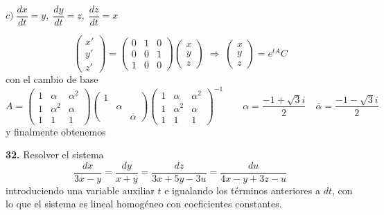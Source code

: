 \begin{ejer}
\begin{sol}
    \end{sol}
    $c) \; \dfrac{dx}{dt}=y, \; \dfrac{dy}{dt}=z, \; \dfrac{dz}{dt}=x$
    \begin{sol}
        $$\begin{pmatrix}
            x' \\ y' \\ z'
        \end{pmatrix}=\begin{pmatrix}
            0 & 1 & 0 \\
            0 & 0 & 1 \\
            1 & 0 & 0 
        \end{pmatrix}\begin{pmatrix}
            x \\ y \\ z
        \end{pmatrix} \; \Rightarrow \; \begin{pmatrix}
            x \\ y \\ z 
        \end{pmatrix}=e^{tA}C$$
        con el cambio de base
        $$A=\begin{pmatrix}
            1 & \alpha & \alpha^2 \\ 1 & \alpha^2 & \alpha \\ 1 & 1 & 1
        \end{pmatrix}\begin{pmatrix}
            1 & \\ & \alpha \\ & & \overline{\alpha}
        \end{pmatrix}\begin{pmatrix}
            1 & \alpha & \alpha^2 \\ 1 & \alpha^2 & \alpha \\ 1 & 1 & 1
        \end{pmatrix}^{-1} \qquad \alpha=\dfrac{-1+\sqrt{3}i}{2} \quad \overline{\alpha}=\dfrac{-1-\sqrt{3}i}{2}$$
        y finalmente obtenemos
    \end{sol}
\end{ejer}
\begin{ejer}
    \textbf{32.} Resolver el sistema
    $$\dfrac{dx}{3x-y}=\dfrac{dy}{x+y}=\dfrac{dz}{3x+5y-3u}=\dfrac{du}{4x-y+3z-u}$$
    introduciendo una variable auxiliar $t$ e igualando los términos anteriores a $dt$, con
lo que el sistema es lineal homogéneo con coeficientes constantes.
\end{ejer}
